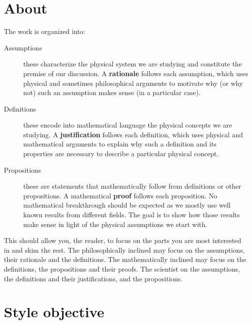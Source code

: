 \documentclass[aps,pra,10pt,twocolumn,floatfix,nofootinbib]{revtex4-1}
\theoremstyle{definition}
\begin{document}

\section{About}

The work is organized into:
\begin{description}
  \item[Assumptions] these characterize the physical system we are studying and constitute the premise of our discussion. A \textbf{rationale} follows each assumption, which uses physical and sometimes philosophical arguments to motivate why (or why not) such an assumption makes sense (in a particular case).
  \item[Definitions] these encode into mathematical language the physical concepts we are studying. A \textbf{justification} follows each definition, which uses physical and mathematical arguments to explain why such a definition and its properties are necessary to describe a particular physical concept.
  \item[Propositions] these are statements that mathematically follow from definitions or other propositions. A mathematical \textbf{proof} follows each proposition. No mathematical breakthrough should be expected as we mostly use well known results from different fields. The goal is to show how those results make sense in light of the physical assumptions we start with.
\end{description}
This should allow you, the reader, to focus on the parts you are most interested in and skim the rest. The philosophically inclined may focus on the assumptions, their rationale and the definitions. The mathematically inclined may focus on the definitions, the propositions and their proofs. The scientist on the assumptions, the definitions and their justifications, and the propositions.

\section{Style objective}
\end{document}
